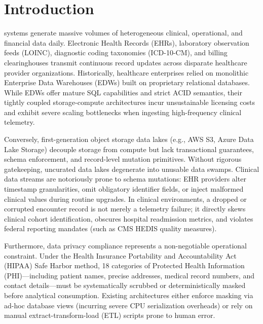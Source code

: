 \documentclass[10pt,journal,compsoc]{IEEEtran}
\begin{document}
\section{Introduction}
 systems generate massive volumes of heterogeneous clinical, operational, and financial data daily. Electronic Health Records (EHRs), laboratory observation feeds (LOINC), diagnostic coding taxonomies (ICD-10-CM), and billing clearinghouses transmit continuous record updates across disparate healthcare provider organizations. Historically, healthcare enterprises relied on monolithic Enterprise Data Warehouses (EDWs) built on proprietary relational databases. While EDWs offer mature SQL capabilities and strict ACID semantics, their tightly coupled storage-compute architectures incur unsustainable licensing costs and exhibit severe scaling bottlenecks when ingesting high-frequency clinical telemetry.

Conversely, first-generation object storage data lakes (e.g., AWS S3, Azure Data Lake Storage) decouple storage from compute but lack transactional guarantees, schema enforcement, and record-level mutation primitives. Without rigorous gatekeeping, uncurated data lakes degenerate into unusable data swamps. Clinical data streams are notoriously prone to schema mutations: EHR providers alter timestamp granularities, omit obligatory identifier fields, or inject malformed clinical values during routine upgrades. In clinical environments, a dropped or corrupted encounter record is not merely a telemetry failure; it directly skews clinical cohort identification, obscures hospital readmission metrics, and violates federal reporting mandates (such as CMS HEDIS quality measures).

Furthermore, data privacy compliance represents a non-negotiable operational constraint. Under the Health Insurance Portability and Accountability Act (HIPAA) Safe Harbor method, 18 categories of Protected Health Information (PHI)---including patient names, precise addresses, medical record numbers, and contact details---must be systematically scrubbed or deterministically masked before analytical consumption. Existing architectures either enforce masking via ad-hoc database views (incurring severe CPU serialization overheads) or rely on manual extract-transform-load (ETL) scripts prone to human error.
\end{document}
